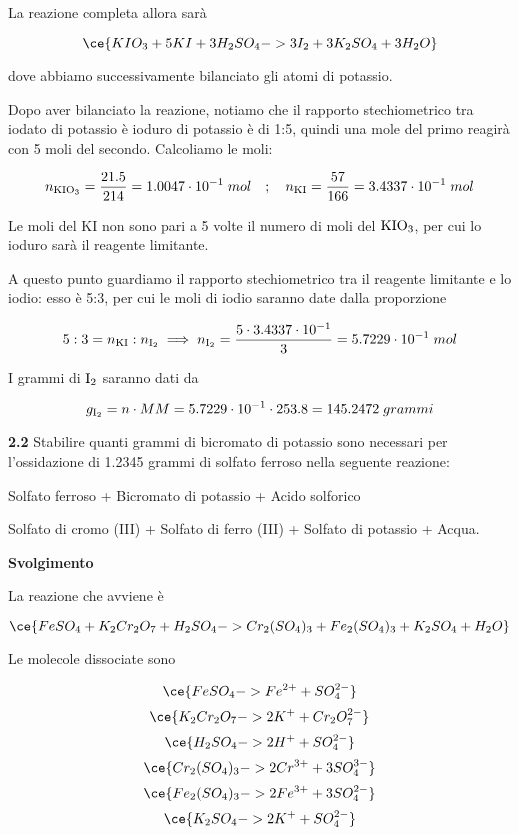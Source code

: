 La reazione completa allora sarà

$$\ce{KIO_3 + 5KI + 3H_2SO_4 -> 3I_2 + 3K_2SO_4 + 3H_2O}$$

dove abbiamo successivamente bilanciato gli atomi di potassio.

Dopo aver bilanciato la reazione, notiamo che il rapporto stechiometrico tra iodato di potassio è ioduro di potassio è di 1:5, quindi una mole del primo reagirà con 5 moli del secondo. Calcoliamo le moli:

$$n_{\rm KIO_3}=\frac{21.5}{214}=1.0047 \cdot 10^{-1}\;mol
\quad;\quad
n_{\rm KI}=\frac{57}{166}=3.4337 \cdot 10^{-1}\;mol$$

Le moli del KI non sono pari a 5 volte il numero di moli del $\rm KIO_3$, per cui lo ioduro sarà il reagente limitante.

A questo punto guardiamo il rapporto stechiometrico tra il reagente limitante e lo iodio: esso è 5:3, per cui le moli di iodio saranno date dalla proporzione

$$5:3=n_{\rm KI}:n_{\rm I_2}
\implies
n_{\rm I_2}=\frac{5 \cdot 3.4337 \cdot 10^{-1}}{3}=5.7229 \cdot 10^{-1}\;mol$$

I grammi di $\rm I_2$ saranno dati da

$$g_{\rm I_2}=n \cdot MM
=5.7229 \cdot 10^{-1} \cdot 253.8
=145.2472\;grammi$$


\vspace{0.2cm}\textbf{2.2} Stabilire quanti grammi di bicromato di potassio sono necessari per l'ossidazione di 1.2345 grammi di solfato ferroso nella seguente reazione:

\begin{center}
    Solfato ferroso + Bicromato di potassio + Acido solforico \ce{->}
    
    \ce{->} Solfato di cromo (III) + Solfato di ferro (III) + Solfato di potassio + Acqua.   
\end{center}

\large\textbf{Svolgimento}\normalsize

\vspace{0.2cm}La reazione che avviene è

$$\ce{FeSO_4 + K_2Cr_2O_7 + H_2SO_4 -> Cr_2(SO_4)_3 + Fe_2(SO_4)_3 + K_2SO_4 + H_2O}$$

Le molecole dissociate sono

$$\ce{FeSO_4 -> Fe^{2+} + SO_4^{2-}}$$
$$\ce{K_2Cr_2O_7 -> 2K^+ + Cr_2O_7^{2-}}$$
$$\ce{H_2SO_4 -> 2H^+ + SO_4^{2-}}$$
$$\ce{Cr_2(SO_4)_3 -> 2Cr^{3+} + 3SO_4^{3-}}$$
$$\ce{Fe_2(SO_4)_3 -> 2Fe^{3+} + 3SO_4^{2-}}$$
$$\ce{K_2SO_4 -> 2K^+ + SO_4^{2-}}$$

